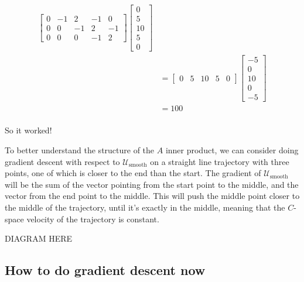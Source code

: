 \documentclass[twoside]{article}
\newcommand{\cus}{\mathcal{U}_\text{smooth}}
\begin{document}
\begin{align*}
\begin{bmatrix}
                    0 & -1 & 2 & -1 & 0 \\
                    0 & 0 & -1 & 2 & -1 \\
                    0 & 0 & 0 & -1 & 2
                  \end{bmatrix}
                  \begin{bmatrix}
                    0 \\
                    5 \\
                    10 \\
                    5 \\
                    0
                  \end{bmatrix} \\
                &=\begin{bmatrix}
                    0 & 5 & 10 & 5 & 0
                  \end{bmatrix}
                  \begin{bmatrix}
                    -5 \\
                    0 \\
                    10 \\
                    0 \\
                    -5
                  \end{bmatrix} \\
                &= 100 \\
\end{align*}

So it worked!

To better understand the structure of the $A$ inner product, we can consider doing gradient descent with respect to $\cus$ on a straight line trajectory with three points, one of which is closer to the end than the start. The gradient of $\cus$ will be the sum of the vector pointing from the start point to the middle, and the vector from the end point to the middle. This will push the middle point closer to the middle of the trajectory, until it's exactly in the middle, meaning that the $C$-space velocity of the trajectory is constant.

DIAGRAM HERE

\subsection{How to do gradient descent now}
\label{sec:how-do-gradient}
\end{document}
